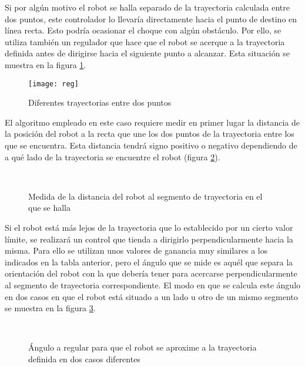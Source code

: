 Si por algún motivo el robot se halla separado de la trayectoria calculada entre dos puntos, este controlador lo llevaría directamente hacia el punto de destino en línea recta. Esto podría ocasionar el choque con algún obstáculo. Por ello, se utiliza también un regulador que hace que el robot se acerque a la trayectoria definida antes de dirigirse hacia el siguiente punto a alcanzar. Esta situación se muestra en la figura \ref{fg:reg}.

\begin{figure}[h]
  \centering\texttt{[image: reg]}\\
  \caption{Diferentes trayectorias entre dos puntos}\label{fg:reg}
\end{figure}

El algoritmo empleado en este caso requiere medir en primer lugar la distancia de la posición del robot a la recta que une los dos puntos de la trayectoria entre los que se encuentra. Esta distancia tendrá signo positivo o negativo dependiendo de a qué lado de la trayectoria se encuentre el robot (figura \ref{fg:dist2tray}).

\begin{figure}[h]
    \\
  \caption{ Medida de la distancia del robot al segmento de trayectoria en el que se halla}\label{fg:dist2tray}
\end{figure}

\clearpage

Si el robot está más lejos de la trayectoria que lo establecido por un cierto valor límite, se realizará un control que tienda a dirigirlo perpendicularmente hacia la misma. Para ello se utilizan unos valores de ganancia muy similares a los indicados en la tabla anterior, pero el ángulo que se mide es aquél que separa la orientación del robot con la que debería tener para acercarse perpendicularmente al segmento de trayectoria correspondiente. El modo en que se calcula este ángulo en dos casos en que el robot está situado a un lado u otro de un mismo segmento se muestra en la figura \ref{fg:regu}.

\begin{figure}[hbt]
    \\
  \caption{Ángulo a regular para que el robot se aproxime a la trayectoria definida en dos casos diferentes}\label{fg:regu}
\end{figure}


